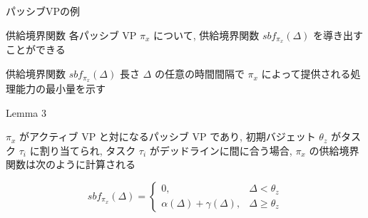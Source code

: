 \begin{frame}{パッシブVPの例}
\end{frame}


\begin{frame}{供給境界関数}
    各パッシブ VP $\pi_{x}$ について, 供給境界関数 $s b f_{\pi_{x}}(\Delta)$ を導き出すことができる
    \begin{block}{供給境界関数 $s b f_{\pi_{x}}(\Delta)$}
        長さ $\Delta$ の任意の時間間隔で $\pi_{x}$ によって提供される処理能力の最小量を示す
    \end{block}
\end{frame}

\begin{frame}[label=lemma3]{Lemma 3}
    \begin{lemma}[]
        $\pi_{x}$ がアクティブ VP と対になるパッシブ VP であり, 初期バジェット $\theta_{z}$ がタスク $\tau_{i}$ に割り当てられ, タスク $\tau_{i}$ がデッドラインに間に合う場合, $\pi_{x}$ の供給境界関数は次のように計算される

        \begin{equation*}
            s b f_{\pi_{x}}(\Delta)= \begin{cases}0, & \Delta<\theta_{z} \\ \alpha(\Delta)+\gamma(\Delta), & \Delta \geq \theta_{z}\end{cases}
        \end{equation*}
    \end{lemma}
\end{frame}

